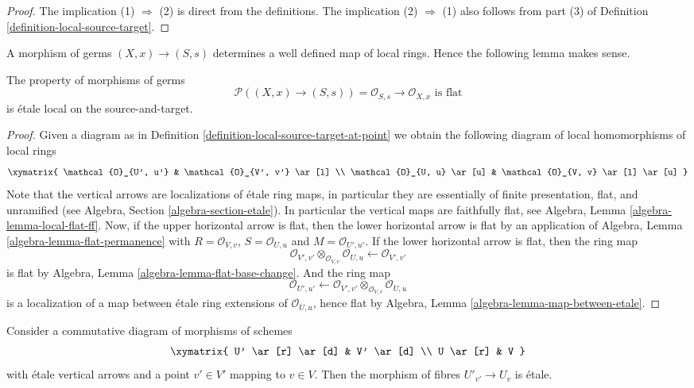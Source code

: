 \begin{proof}
The implication (1) $\Rightarrow$ (2) is direct from the definitions.
The implication (2) $\Rightarrow$ (1) also follows from part (3) of
Definition \ref{definition-local-source-target}.
\end{proof}

\noindent
A morphism of germs $(X, x) \to (S, s)$ determines a well defined
map of local rings. Hence the following lemma makes sense.

\begin{lemma}
\label{lemma-flat-at-point}
The property of morphisms of germs
$$
\mathcal{P}((X, x) \to (S, s)) =
\mathcal{O}_{S, s} \to \mathcal{O}_{X, x}\text{ is flat}
$$
is \'etale local on the source-and-target.
\end{lemma}

\begin{proof}
Given a diagram as in
Definition \ref{definition-local-source-target-at-point}
we obtain the following diagram of local homomorphisms of local rings
$$
\xymatrix{
\mathcal{O}_{U', u'} & \mathcal{O}_{V', v'} \ar[l] \\
\mathcal{O}_{U, u} \ar[u] & \mathcal{O}_{V, v} \ar[l] \ar[u]
}
$$
Note that the vertical arrows are localizations of \'etale ring maps,
in particular they are essentially of finite presentation, flat,
and unramified (see
Algebra, Section \ref{algebra-section-etale}).
In particular the vertical maps are faithfully flat, see
Algebra, Lemma \ref{algebra-lemma-local-flat-ff}.
Now, if the upper horizontal arrow is flat, then the lower horizontal
arrow is flat by an application of
Algebra, Lemma \ref{algebra-lemma-flat-permanence}
with $R = \mathcal{O}_{V, v}$, $S = \mathcal{O}_{U, u}$ and
$M = \mathcal{O}_{U', u'}$. If the lower horizontal arrow is
flat, then the ring map
$$
\mathcal{O}_{V', v'} \otimes_{\mathcal{O}_{V, v}} \mathcal{O}_{U, u}
\longleftarrow
\mathcal{O}_{V', v'}
$$
is flat by
Algebra, Lemma \ref{algebra-lemma-flat-base-change}.
And the ring map
$$
\mathcal{O}_{U', u'}
\longleftarrow
\mathcal{O}_{V', v'} \otimes_{\mathcal{O}_{V, v}} \mathcal{O}_{U, u}
$$
is a localization of a map between \'etale ring extensions of
$\mathcal{O}_{U, u}$, hence flat by
Algebra, Lemma \ref{algebra-lemma-map-between-etale}.
\end{proof}

\begin{lemma}
\label{lemma-etale-on-fiber}
Consider a commutative diagram of morphisms of schemes
$$
\xymatrix{
U' \ar[r] \ar[d] & V' \ar[d] \\
U \ar[r] & V
}
$$
with \'etale vertical arrows and a point $v' \in V'$ mapping to $v \in V$.
Then the morphism of fibres $U'_{v'} \to U_v$ is \'etale.
\end{lemma}

